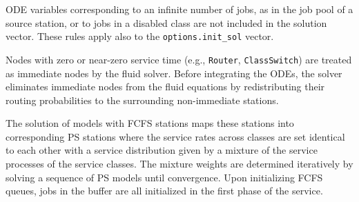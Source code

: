 ODE variables corresponding to an infinite number of jobs, as in the job pool of a source station, or to jobs in a disabled class are not included in the solution vector. These rules apply also to the \texttt{options.init\_sol} vector.

Nodes with zero or near-zero service time (e.g., \texttt{Router}, \texttt{ClassSwitch}) are treated as immediate nodes by the fluid solver. Before integrating the ODEs, the solver eliminates immediate nodes from the fluid equations by redistributing their routing probabilities to the surrounding non-immediate stations.

The solution of models with FCFS stations maps these stations into corresponding PS stations where the service rates across classes are set identical to each other with a service distribution given by a mixture of the service processes of the service classes. The mixture weights are determined iteratively by solving a sequence of PS models until convergence. Upon initializing FCFS queues, jobs in the buffer are all initialized in the first phase of the service.

